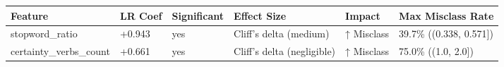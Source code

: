 \begin{tabular}{llllll}
\toprule
Feature & LR Coef & Significant & Effect Size & Impact & Max Misclass Rate \\
\midrule
stopword\_ratio & +0.943 & yes & Cliff's delta (medium) & ↑ Misclass & 39.7\% ((0.338, 0.571]) \\
certainty\_verbs\_count & +0.661 & yes & Cliff's delta (negligible) & ↑ Misclass & 75.0\% ((1.0, 2.0]) \\
\bottomrule
\end{tabular}
